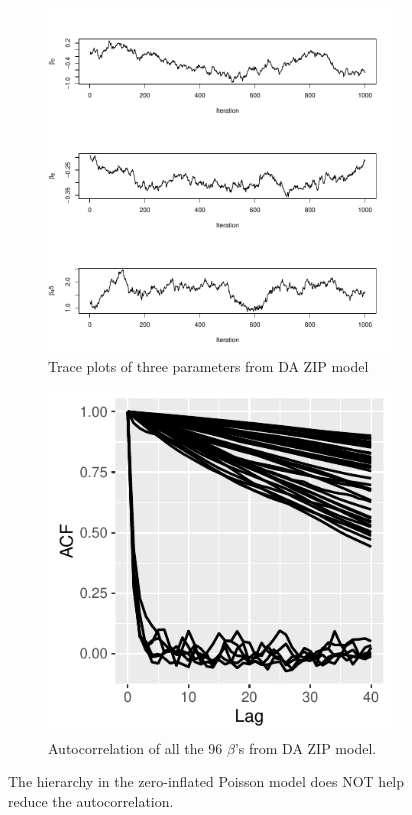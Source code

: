 \documentclass[10pt]{article}
\begin{document}
 \begin{figure}[H]
   \begin{subfigure}[b]{0.45\textwidth}
 \includegraphics[width=1\textwidth]{traceplot_poisson_zip_da.pdf}
 \caption{Trace plots of three parameters from DA ZIP model}
 \end{subfigure}
  \hfill 
 \begin{subfigure}[b]{0.45\textwidth}
 \includegraphics[width=1\textwidth]{poisson_zip_da_acf.pdf}
 \caption{Autocorrelation of all the 96 $\beta$'s from DA ZIP model.}
 \end{subfigure}  
 \caption{The hierarchy in the zero-inflated Poisson model does NOT help reduce the autocorrelation.}
 \end{figure}
\end{document}
